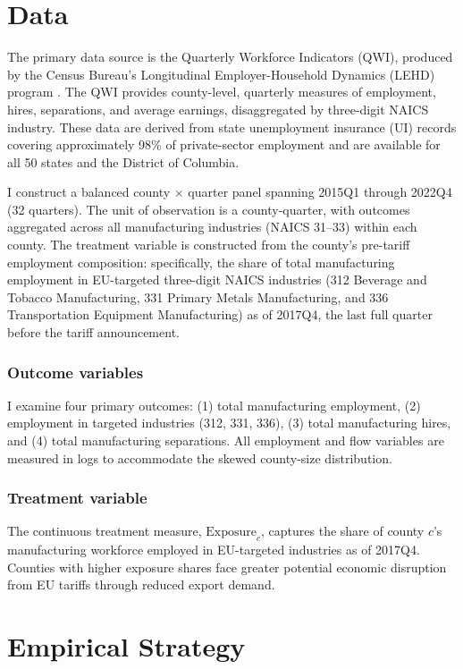 \documentclass[12pt]{article}
\begin{document}
\section{Data}

The primary data source is the Quarterly Workforce Indicators (QWI), produced by the Census Bureau's Longitudinal Employer-Household Dynamics (LEHD) program \citep{abowd2009lehd}. The QWI provides county-level, quarterly measures of employment, hires, separations, and average earnings, disaggregated by three-digit NAICS industry. These data are derived from state unemployment insurance (UI) records covering approximately 98\% of private-sector employment and are available for all 50 states and the District of Columbia.

I construct a balanced county $\times$ quarter panel spanning 2015Q1 through 2022Q4 (32 quarters). The unit of observation is a county-quarter, with outcomes aggregated across all manufacturing industries (NAICS 31--33) within each county. The treatment variable is constructed from the county's pre-tariff employment composition: specifically, the share of total manufacturing employment in EU-targeted three-digit NAICS industries (312 Beverage and Tobacco Manufacturing, 331 Primary Metals Manufacturing, and 336 Transportation Equipment Manufacturing) as of 2017Q4, the last full quarter before the tariff announcement.

\subsubsection*{Outcome variables} I examine four primary outcomes: (1) total manufacturing employment, (2) employment in targeted industries (312, 331, 336), (3) total manufacturing hires, and (4) total manufacturing separations. All employment and flow variables are measured in logs to accommodate the skewed county-size distribution.

\subsubsection*{Treatment variable} The continuous treatment measure, $\text{Exposure}_c$, captures the share of county $c$'s manufacturing workforce employed in EU-targeted industries as of 2017Q4. Counties with higher exposure shares face greater potential economic disruption from EU tariffs through reduced export demand.




\section{Empirical Strategy}
\end{document}
